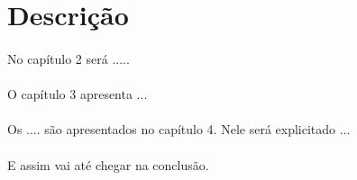 \section{Descrição}

\paragraph{}No capítulo 2 será .....

\paragraph{}O capítulo 3 apresenta ...

\paragraph{}Os .... são apresentados no capítulo 4. Nele será explicitado ...

\paragraph{}E assim vai até chegar na conclusão.
